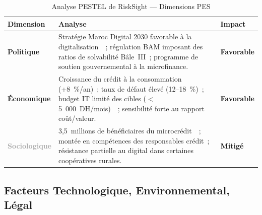 \documentclass[12pt, a4paper]{report}
\begin{document}
\begin{table}[H]
\centering
\caption{Analyse PESTEL de RiskSight --- Dimensions PES}
\label{tab:pestel_pes}
\renewcommand{\arraystretch}{1.4}
\begin{tabularx}{\textwidth}{>{\bfseries}p{3cm} X p{2.8cm}}
\toprule
\rowcolor{primary!12}
Dimension & Analyse & Impact \\
\midrule
\textcolor{primary}{Politique}
  & Stratégie Maroc Digital 2030 favorable à la digitalisation~\cite{maroc_digital}~;
    régulation BAM imposant des ratios de solvabilité Bâle~III~;
    programme de soutien gouvernemental à la microfinance.
  & \textcolor{successcolor}{\textbf{Favorable}} \\
\midrule
\textcolor{secondary}{Économique}
  & Croissance du crédit à la consommation (+8~\%/an)~;
    taux de défaut élevé (12--18~\%)~;
    budget IT limité des cibles ($<$5~000~DH/mois)~\cite{tp3_faisabilite}~;
    sensibilité forte au rapport coût/valeur.
  & \textcolor{successcolor}{\textbf{Favorable}} \\
\midrule
\textcolor{darkgray}{Sociologique}
  & 3,5~millions de bénéficiaires du microcrédit~\cite{fnam}~;
    montée en compétences des responsables crédit~;
    résistance partielle au digital dans certaines coopératives rurales.
  & \textcolor{secondary}{\textbf{Mitigé}} \\
\bottomrule
\end{tabularx}
\end{table}

\subsection{Facteurs Technologique, Environnemental, Légal}
\end{document}
